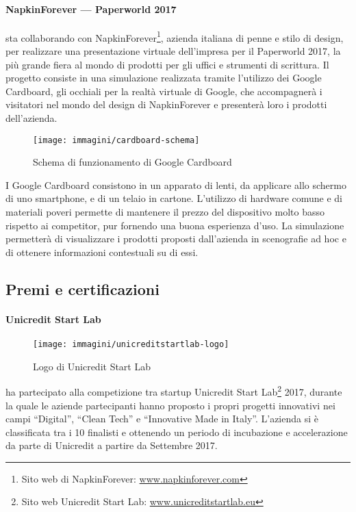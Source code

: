    \paragraph{NapkinForever --- Paperworld 2017}
   \nomeAzienda{} sta collaborando con NapkinForever\footnote{Sito web di NapkinForever: \href{www.napkinforever.com}{www.napkinforever.com}}, azienda italiana di penne e stilo di design, per realizzare una presentazione virtuale dell'impresa per il Paperworld 2017, la più grande fiera al mondo di prodotti per gli uffici e strumenti di scrittura. Il progetto consiste in una simulazione realizzata tramite l'utilizzo dei Google Cardboard, gli occhiali per la realtà virtuale di Google, che accompagnerà i visitatori nel mondo del design di NapkinForever e presenterà loro i prodotti dell'azienda.
   \begin{figure}[H]
      \begin{center}
         \texttt{[image: immagini/cardboard-schema]}
      \end{center}
      \caption{Schema di funzionamento di Google Cardboard}\label{schemacardboard}
   \end{figure}
   I Google Cardboard consistono in un apparato di lenti, da applicare allo schermo di uno smartphone, e di un telaio in cartone. L'utilizzo di hardware comune e di materiali poveri permette di mantenere il prezzo del dispositivo molto basso rispetto ai competitor, pur fornendo una buona esperienza d'uso. La simulazione permetterà di visualizzare i prodotti proposti dall'azienda in scenografie ad hoc e di ottenere informazioni contestuali su di essi.

   \subsection{Premi e certificazioni}

   \paragraph{Unicredit Start Lab}
   \begin{figure}[H]
      \begin{center}
         \texttt{[image: immagini/unicreditstartlab-logo]}
      \end{center}
      \caption{Logo di Unicredit Start Lab}\label{logounicreditstartlab}
   \end{figure}
   \nomeAzienda{} ha partecipato alla competizione tra startup Unicredit Start Lab\footnote{Sito web Unicredit Start Lab: \href{http://www.unicreditstartlab.eu}{www.unicreditstartlab.eu}} 2017, durante la quale le aziende partecipanti hanno proposto i propri progetti innovativi nei campi ``Digital'', ``Clean Tech'' e ``Innovative Made in Italy''. L'azienda si è classificata tra i 10 finalisti e ottenendo un periodo di incubazione e accelerazione da parte di Unicredit a partire da Settembre 2017.

